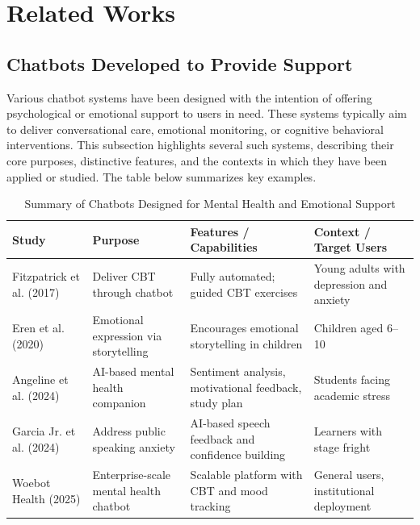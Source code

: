 %
%
%                 

\chapter{Related Works}\label{sec:relatedworks}

\section{Chatbots Developed to Provide Support}

Various chatbot systems have been designed with the intention of offering psychological or emotional support to users in need. These systems typically aim to deliver conversational care, emotional monitoring, or cognitive behavioral interventions. This subsection highlights several such systems, describing their core purposes, distinctive features, and the contexts in which they have been applied or studied. The table below summarizes key examples.

\begin{table}[H]
\centering
\caption{Summary of Chatbots Designed for Mental Health and Emotional Support}
\small
\begin{tabular}{p{3.3cm} p{3.7cm} p{3.7cm} p{3.7cm}}
\toprule
\textbf{Study} & \textbf{Purpose} & \textbf{Features / Capabilities} & \textbf{Context / Target Users} \\
\midrule
Fitzpatrick et al. (2017) & Deliver CBT through chatbot & Fully automated; guided CBT exercises & Young adults with depression and anxiety \\
Eren et al. (2020) & Emotional expression via storytelling & Encourages emotional storytelling in children & Children aged 6–10 \\
Angeline et al. (2024) & AI-based mental health companion & Sentiment analysis, motivational feedback, study plan & Students facing academic stress \\
Garcia Jr. et al. (2024) & Address public speaking anxiety & AI-based speech feedback and confidence building & Learners with stage fright \\
Woebot Health (2025) & Enterprise-scale mental health chatbot & Scalable platform with CBT and mood tracking & General users, institutional deployment \\
\bottomrule
\end{tabular}
\end{table}


